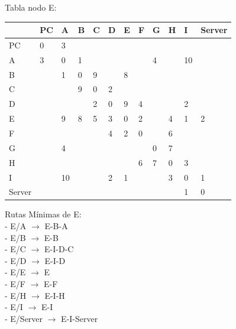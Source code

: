 \documentclass[a4paper]{article}
\begin{document}
\begin{table}[ht]
Tabla nodo E:\\
\begin{tabular}{|l|l|l|l|l|l|l|l|l|l|l|l|}
\hline
       & PC & A  & B & C & D & E & F & G & H & I  & Server \\ \hline
PC     & 0  & 3  &   &   &   &   &   &   &   &    &        \\ \hline
A      & 3  & 0  & 1 &   &   &   &   & 4 &   & 10 &        \\ \hline
B      &    & 1  & 0 & 9 &   & 8 &   &   &   &    &        \\ \hline
C      &    &    & 9 & 0 & 2 &   &   &   &   &    &        \\ \hline
D      &    &    &   & 2 & 0 & 9 & 4 &   &   & 2  &        \\ \hline
E      &    & 9  & 8 & 5 & 3 & 0 & 2 &   & 4 & 1  & 2      \\ \hline
F      &    &    &   &   & 4 & 2 & 0 &   & 6 &    &        \\ \hline
G      &    & 4  &   &   &   &   &   & 0 & 7 &    &        \\ \hline
H      &    &    &   &   &   &   & 6 & 7 & 0 & 3  &        \\ \hline
I      &    & 10 &   &   & 2 & 1 &   &   & 3 & 0  & 1      \\ \hline
Server &    &    &   &   &   &   &   &   &   & 1  & 0      \\ \hline
\end{tabular}

Rutas Mínimas de E:\\
-	E/A  $\rightarrow$  E-B-A\\
-	E/B  $\rightarrow$  E-B\\
-	E/C  $\rightarrow$  E-I-D-C\\
-	E/D  $\rightarrow$  E-I-D\\
-	E/E  $\rightarrow$  E\\
-	E/F  $\rightarrow$  E-F\\
-	E/H  $\rightarrow$  E-I-H\\
-	E/I  $\rightarrow$  E-I\\
-	E/Server  $\rightarrow$  E-I-Server\\

\end{table}


\clearpage
\end{document}
